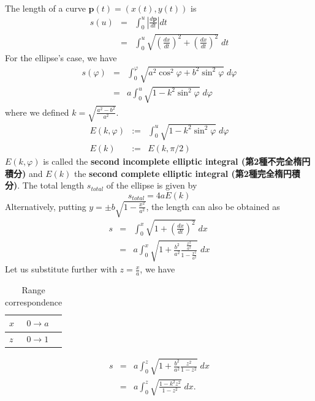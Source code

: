 \documentclass{article}
\begin{document}
The length of a curve $\mathbf{p}(t) = (x(t), y(t))$ is
\begin{eqnarray}
s(u) &=& \int_{0}^{u} \left| \frac{d \mathbf{p}}{d t} \right| dt  \\ \nonumber
     &=& \int_{0}^{u} \sqrt{ \left( \frac{d x}{d t} \right)^{2} +  \left( \frac{d x}{d t} \right)^{2} } \; dt
\end{eqnarray}
For the ellipse's case, we have
\begin{eqnarray}
s(\varphi) &=& \int_{0}^{\varphi} \sqrt{ a^{2} \cos^{2}{\varphi} +  b^{2}  \sin^{2}{\varphi}} \; d\varphi \\ \nonumber
     &=& a \int_{0}^{u} \sqrt{ 1 -  k^{2}  \sin^{2}{\varphi}} \; d\varphi 
\end{eqnarray}
where we defined $k = \sqrt{\frac{a^2 - b^2}{a^2}}$.
\begin{eqnarray}
E(k, \varphi ) &:=& \int_{0}^{u} \sqrt{ 1 -  k^{2}  \sin^{2}{\varphi}} \; d\varphi \\
E(k) &:=& E(k,  \pi/2 )
\end{eqnarray}
$E(k, \varphi )$ is called the \textbf{second incomplete elliptic integral (第2種不完全楕円積分)} and $E(k)$ the \textbf{second complete elliptic integral (第2種完全楕円積分)}. The total length $s_{total}$ of the ellipse is given by 
\begin{equation}
s_{total} = 4a E(k) 
\end{equation}
Alternatively, putting $y = \pm b \sqrt{1 - \frac{x^{2}}{a^{2}}}$, the length can also be obtained as
\begin{eqnarray}
s &=& \int_{0}^{x} \sqrt{ 1  +  \left( \frac{d x}{d t} \right)^{2} } \; dx \\ \nonumber
     &=& a \int_{0}^{x} \sqrt{ 1  +   \frac{b^{2}}{a^{2}} \frac{\frac{x^{2}}{a^{2}}}{1 - \frac{x^{2}}{a^{2}}} } \; dx
\end{eqnarray}
Let us substitute further with $z = \frac{x}{a}$, we have
\begin{table}[htb]
\caption{Range correspondence}
\centering
\begin{tabular}{ll}
$x$ & $0 \rightarrow a$\\
\hline
$z$ & $0 \rightarrow 1$\\
\end{tabular}
\end{table}

\begin{eqnarray}
s &=& a \int_{0}^{z} \sqrt{ 1  +   \frac{b^{2}}{a^{2}} \frac{z^{2}}{1 - z^{2}} } \; dx \\ \nonumber
  &=& a \int_{0}^{z} \sqrt{ \frac{1 -k ^{2} z^{2}}{1 - z^{2}} } \; dx.
\end{eqnarray}
\end{document}
